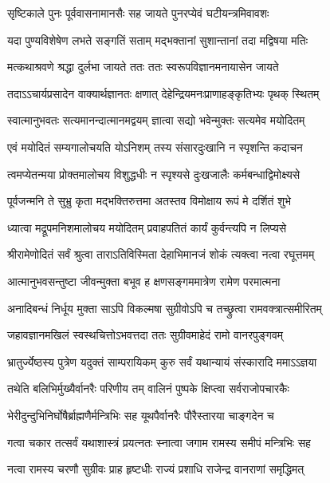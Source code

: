 \twolineshloka
{सृष्टिकाले पुनः पूर्ववासनामानसैः सह}
{जायते पुनरप्येवं घटीयन्त्रमिवावशः} %

\twolineshloka
{यदा पुण्यविशेषेण लभते सङ्गतिं सताम्}
{मद्भक्तानां सुशान्तानां तदा मद्विषया मतिः} %

\twolineshloka
{मत्कथाश्रवणे श्रद्धा दुर्लभा जायते ततः}
{ततः स्वरूपविज्ञानमनायासेन जायते} %

\twolineshloka
{तदाऽऽचार्यप्रसादेन वाक्यार्थज्ञानतः क्षणात्}
{देहेन्द्रियमनःप्राणाहङ्कृतिभ्यः पृथक् स्थितम्} %

\twolineshloka
{स्वात्मानुभवतः सत्यमानन्दात्मानमद्वयम्}
{ज्ञात्वा सद्यो भवेन्मुक्तः सत्यमेव मयोदितम्} %

\twolineshloka
{एवं मयोदितं सम्यगालोचयति योऽनिशम्}
{तस्य संसारदुःखानि न स्पृशन्ति कदाचन} %

\twolineshloka
{त्वमप्येतन्मया प्रोक्तमालोचय विशुद्धधीः}
{न स्पृश्यसे दुःखजालैः कर्मबन्धाद्विमोक्ष्यसे} %

\twolineshloka
{पूर्वजन्मनि ते सुभ्रु कृता मद्भक्तिरुत्तमा}
{अतस्तव विमोक्षाय रूपं मे दर्शितं शुभे} %

\twolineshloka
{ध्यात्वा मद्रूपमनिशमालोचय मयोदितम्}
{प्रवाहपतितं कार्यं कुर्वन्त्यपि न लिप्यसे} %

\twolineshloka
{श्रीरामेणोदितं सर्वं श्रुत्वा ताराऽतिविस्मिता}
{देहाभिमानजं शोकं त्यक्त्वा नत्वा रघूत्तमम्} %

\twolineshloka
{आत्मानुभवसन्तुष्टा जीवन्मुक्ता बभूव ह}
{क्षणसङ्गममात्रेण रामेण परमात्मना} %

\twolineshloka
{अनादिबन्धं निर्धूय मुक्ता साऽपि विकल्मषा}
{सुग्रीवोऽपि च तच्छ्रुत्वा रामवक्त्रात्समीरितम्} %

\twolineshloka
{जहावज्ञानमखिलं स्वस्थचित्तोऽभवत्तदा}
{ततः सुग्रीवमाहेदं रामो वानरपुङ्गवम्} %

\twolineshloka
{भ्रातुर्ज्येष्ठस्य पुत्रेण यदुक्तं साम्परायिकम्}
{कुरु सर्वं यथान्यायं संस्कारादि ममाऽऽज्ञया} %

\twolineshloka
{तथेति बलिभिर्मुख्यैर्वानरैः परिणीय तम्}
{वालिनं पुष्पके क्षिप्त्वा सर्वराजोपचारकैः} %

\twolineshloka
{भेरीदुन्दुभिनिर्घोषैर्ब्राह्मणैर्मन्त्रिभिः सह}
{यूथपैर्वानरैः पौरैस्तारया चाङ्गदेन च} %

\twolineshloka
{गत्वा चकार तत्सर्वं यथाशास्त्रं प्रयत्नतः}
{स्नात्वा जगाम रामस्य समीपं मन्त्रिभिः सह} %

\twolineshloka
{नत्वा रामस्य चरणौ सुग्रीवः प्राह हृष्टधीः}
{राज्यं प्रशाधि राजेन्द्र वानराणां समृद्धिमत्} %

